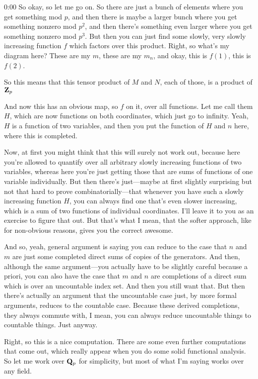 \begin{unfinished}{0:00}
So okay, so let me go on. So there are just a bunch of elements where you get something mod $p$, and then there is maybe a larger bunch where you get something nonzero mod $p^2$, and then there's something even larger where you get something nonzero mod $p^3$. But then you can just find some slowly, very slowly increasing function $f$ which factors over this product. Right, so what's my diagram here? These are my $m$, these are my $m_n$, and okay, this is $f(1)$, this is $f(2)$.

So this means that this tensor product of $M$ and $N$, each of those, is a product of $\mathbf Z_p$

And now this has an obvious map, so $f$ on it, over all functions. Let me call them $H$, which are now functions on both coordinates, which just go to infinity. Yeah, $H$ is a function of two variables, and then you put the function of $H$ and $n$ here, where this is completed.

Now, at first you might think that this will surely not work out, because here you're allowed to quantify over all arbitrary slowly increasing functions of two variables, whereas here you're just getting those that are sums of functions of one variable individually. But then there's just---maybe at first slightly surprising but not that hard to prove combinatorially---that whenever you have such a slowly increasing function $H$, you can always find one that's even slower increasing, which is a sum of two functions of individual coordinates. I'll leave it to you as an exercise to figure that out. But that's what I mean, that the softer approach, like for non-obvious reasons, gives you the correct awesome.

And so, yeah, general argument is saying you can reduce to the case that $n$ and $m$ are just some completed direct sums of copies of the generators. And then, although the same argument---you actually have to be slightly careful because a priori, you can also have the case that $m$ and $n$ are completions of a direct sum which is over an uncountable index set. And then you still want that. But then there's actually an argument that the uncountable case just, by more formal arguments, reduces to the countable case. Because these derived completions, they always commute with, I mean, you can always reduce uncountable things to countable things. Just anyway.

Right, so this is a nice computation. There are some even further computations that come out, which really appear when you do some solid functional analysis. So let me work over $\mathbf Q_p$ for simplicity, but most of what I'm saying works over any field.


\end{unfinished}
